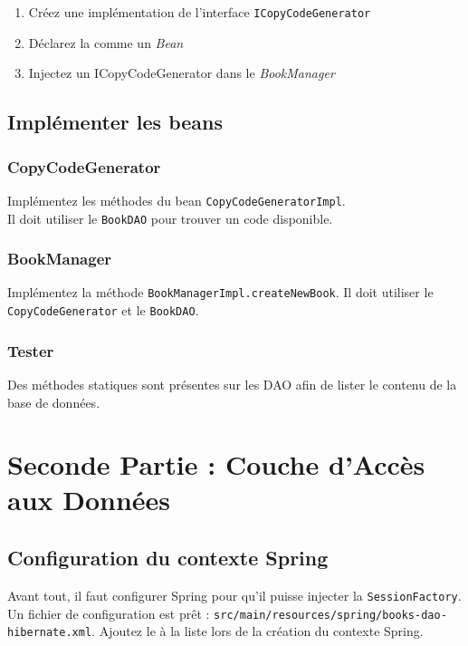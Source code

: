 \documentclass[small,algo]{dushClass}
\begin{document}
\begin{enumerate}
\item Créez une implémentation de l'interface \texttt{ICopyCodeGenerator}
\item Déclarez la comme un \emph{Bean}
\item Injectez un ICopyCodeGenerator dans le \emph{BookManager}
\end{enumerate}


\subsection{Implémenter les beans}

\subsubsection{CopyCodeGenerator}

Implémentez les méthodes du bean \texttt{CopyCodeGeneratorImpl}.\\

Il doit utiliser le \texttt{BookDAO} pour trouver un code disponible.

\subsubsection{BookManager}
Implémentez la méthode \texttt{BookManagerImpl.createNewBook}. Il doit utiliser le \texttt{CopyCodeGenerator} et le \texttt{BookDAO}.

\subsubsection{Tester}

Des méthodes statiques sont présentes sur les DAO afin de lister le contenu de la base de données.





\section{Seconde Partie : Couche d'Accès aux Données}

\subsection{Configuration du contexte Spring}

Avant tout, il faut configurer Spring pour qu'il puisse injecter la \texttt{SessionFactory}. Un fichier de configuration est prêt : \texttt{src/main/resources/spring/books-dao-hibernate.xml}. Ajoutez le à la liste lors de la création du contexte Spring.\\
\end{document}
